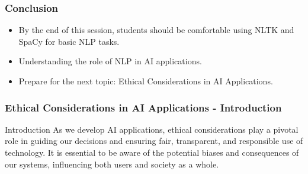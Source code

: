 \documentclass{beamer}
\begin{document}
\begin{frame}
    \frametitle{Conclusion}
    \begin{itemize}
        \item By the end of this session, students should be comfortable using NLTK and SpaCy for basic NLP tasks.
        \item Understanding the role of NLP in AI applications.
        \item Prepare for the next topic: Ethical Considerations in AI Applications.
    \end{itemize}
\end{frame}

\begin{frame}[fragile]
    \frametitle{Ethical Considerations in AI Applications - Introduction}
    \begin{block}{Introduction}
        As we develop AI applications, ethical considerations play a pivotal role in guiding our decisions and ensuring fair, transparent, and responsible use of technology. It is essential to be aware of the potential biases and consequences of our systems, influencing both users and society as a whole.
    \end{block}
\end{frame}
\end{document}
